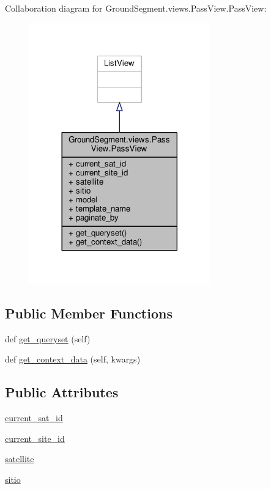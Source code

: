 Collaboration diagram for Ground\+Segment.\+views.\+Pass\+View.\+Pass\+View\+:\nopagebreak
\begin{figure}[H]
\begin{center}
\leavevmode
\includegraphics[width=221pt]{class_ground_segment_1_1views_1_1_pass_view_1_1_pass_view__coll__graph}
\end{center}
\end{figure}
\subsection*{Public Member Functions}
\begin{DoxyCompactItemize}
\item 
def \hyperlink{class_ground_segment_1_1views_1_1_pass_view_1_1_pass_view_a09803db204bdc5b759dca5dbb4e6d2fd}{get\+\_\+queryset} (self)
\item 
def \hyperlink{class_ground_segment_1_1views_1_1_pass_view_1_1_pass_view_a2f28a48a024a1e7891772d86340084a9}{get\+\_\+context\+\_\+data} (self, kwargs)
\end{DoxyCompactItemize}
\subsection*{Public Attributes}
\begin{DoxyCompactItemize}
\item 
\hyperlink{class_ground_segment_1_1views_1_1_pass_view_1_1_pass_view_a8e8fc4abb3f1047f91a5caa19456cc5e}{current\+\_\+sat\+\_\+id}
\item 
\hyperlink{class_ground_segment_1_1views_1_1_pass_view_1_1_pass_view_acd492b8aa45a0ec2d9b89691030737f9}{current\+\_\+site\+\_\+id}
\item 
\hyperlink{class_ground_segment_1_1views_1_1_pass_view_1_1_pass_view_a639aabe3c613cfcc64dde52d282f1bac}{satellite}
\item 
\hyperlink{class_ground_segment_1_1views_1_1_pass_view_1_1_pass_view_a0eb396ce85cf67090e75aded4f3e5f14}{sitio}
\end{DoxyCompactItemize}
